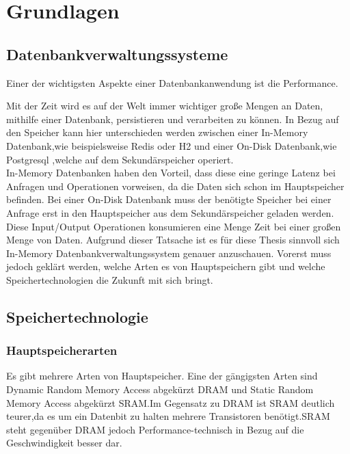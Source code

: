 \chapter{Grundlagen}
\label{Grundlagen}

\section{Datenbankverwaltungssysteme}

Einer der wichtigsten Aspekte einer Datenbankanwendung ist die Performance. 

Mit der Zeit wird es auf der Welt immer wichtiger große Mengen an Daten, mithilfe einer Datenbank, persistieren und verarbeiten zu können.
In Bezug auf den Speicher kann hier unterschieden werden zwischen einer In-Memory Datenbank,wie beispielsweise Redis\cite{Redis} oder H2\cite{H2} und einer On-Disk Datenbank,wie Postgresql \cite{PostgreSQL},welche auf dem Sekundärspeicher operiert. \\

In-Memory Datenbanken haben den Vorteil, dass diese eine geringe Latenz bei Anfragen und Operationen vorweisen, da die Daten sich schon im Hauptspeicher befinden. Bei einer On-Disk Datenbank muss der benötigte Speicher bei einer Anfrage erst in den Hauptspeicher aus dem Sekundärspeicher geladen werden. Diese Input/Output Operationen konsumieren eine Menge Zeit bei einer großen Menge von Daten.\cite{KABAKUS2017520}
Aufgrund dieser Tatsache ist es für diese Thesis sinnvoll sich In-Memory Datenbankverwaltungssystem genauer anzuschauen. 
Vorerst muss jedoch geklärt werden, welche Arten es von Hauptspeichern gibt und welche Speichertechnologien die Zukunft mit sich bringt.

\section{Speichertechnologie}

\subsection{Hauptspeicherarten}

Es gibt mehrere Arten von Hauptspeicher. Eine der gängigsten Arten sind Dynamic Random Memory Access abgekürzt DRAM und Static Random Memory Access abgekürzt SRAM.Im Gegensatz zu DRAM ist SRAM deutlich teurer,da es um ein Datenbit zu halten mehrere Transistoren benötigt.SRAM steht gegenüber DRAM jedoch Performance-technisch in Bezug auf die Geschwindigkeit besser dar.\cite{techtarget:Ram}

